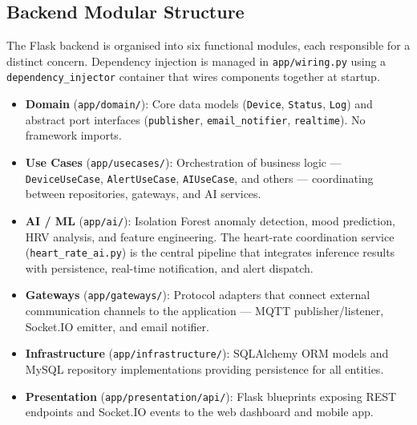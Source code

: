 \FloatBarrier

\subsection{Backend Modular Structure}

The Flask backend is organised into six functional modules, each responsible for a distinct concern. Dependency injection is managed in \texttt{app/wiring.py} using a \texttt{dependency\_injector} container that wires components together at startup.

\begin{itemize}[itemsep=4pt, parsep=0pt, topsep=4pt]

    \item \textbf{Domain} (\texttt{app/domain/}): Core data models (\texttt{Device}, \texttt{Status}, \texttt{Log}) and abstract port interfaces (\texttt{publisher}, \texttt{email\_notifier}, \texttt{realtime}). No framework imports.

    \item \textbf{Use Cases} (\texttt{app/usecases/}): Orchestration of business logic --- \texttt{DeviceUseCase}, \texttt{AlertUseCase}, \texttt{AIUseCase}, and others --- coordinating between repositories, gateways, and AI services.

    \item \textbf{AI / ML} (\texttt{app/ai/}): Isolation Forest anomaly detection, mood prediction, HRV analysis, and feature engineering. The heart-rate coordination service (\texttt{heart\_rate\_ai.py}) is the central pipeline that integrates inference results with persistence, real-time notification, and alert dispatch.

    \item \textbf{Gateways} (\texttt{app/gateways/}): Protocol adapters that connect external communication channels to the application --- MQTT publisher/listener, Socket.IO emitter, and email notifier.

    \item \textbf{Infrastructure} (\texttt{app/infrastructure/}): SQLAlchemy ORM models and MySQL repository implementations providing persistence for all entities.

    \item \textbf{Presentation} (\texttt{app/presentation/api/}): Flask blueprints exposing REST endpoints and Socket.IO events to the web dashboard and mobile app.

\end{itemize}

